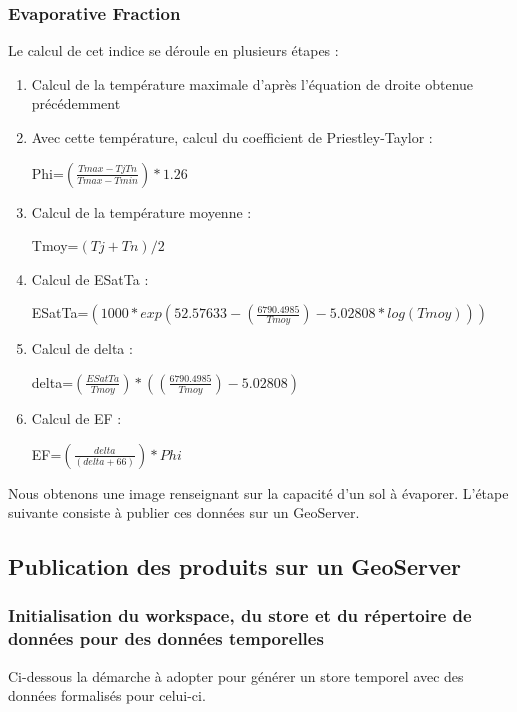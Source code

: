 \documentclass[10pt,a4paper]{article}
\begin{document}
\subsubsection{Evaporative Fraction}

Le calcul de cet indice se déroule en plusieurs étapes :
\begin{enumerate}
\item Calcul de la température maximale d'après l'équation de droite obtenue précédemment
\item Avec cette température, calcul du coefficient de Priestley-Taylor :
\begin{center}
\textrm{Phi}=$ (\frac{Tmax-TjTn}{Tmax-Tmin})*1.26 $
\end{center}\smallbreak
\item Calcul de la température moyenne :
\begin{center}
\textrm{Tmoy}=$ ({Tj+Tn})/2 $
\end{center}\smallbreak
\item Calcul de ESatTa :
\begin{center}
\textrm{ESatTa}=$ (1000*exp(52.57633-(\frac{6790.4985}{Tmoy})-5.02808*log(Tmoy))) $
\end{center}\smallbreak
\item Calcul de delta :
\begin{center}
\textrm{delta}=$ (\frac{ESatTa}{Tmoy}) * ((\frac{6790.4985}{Tmoy})-5.02808) $
\end{center}\smallbreak
\item Calcul de EF :
\begin{center}
\textrm{EF}=$ (\frac{delta}{(delta+66)})*Phi $
\end{center}\smallbreak
\end{enumerate}

Nous obtenons une image renseignant sur la capacité d'un sol à évaporer. L'étape suivante consiste à publier ces données sur un GeoServer.

\subsection{Publication des produits sur un GeoServer}

\subsubsection{Initialisation du workspace, du store et du répertoire de données pour des données temporelles}

Ci-dessous la démarche à adopter pour générer un store temporel avec des données formalisés pour celui-ci.
\end{document}
